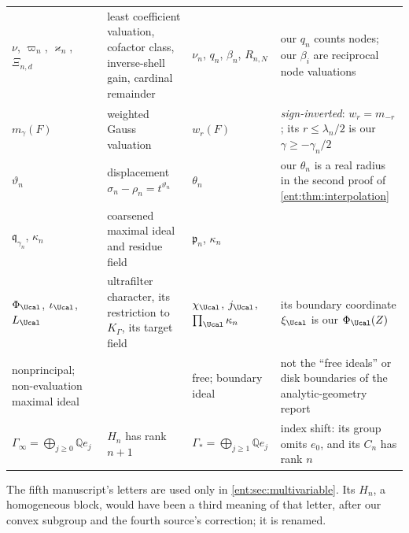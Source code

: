 \documentclass[11pt]{article}
\theoremstyle{plain}
\theoremstyle{plain}
\theoremstyle{plain}
\theoremstyle{definition}
\theoremstyle{definition}
\theoremstyle{definition}
\theoremstyle{definition}
\theoremstyle{remark}
\newcommand{\Q}{\mathbb Q}\newcommand{\Z}{\mathbb Z}\newcommand{\N}{\mathbb N}
\newcommand{\K}{K_\Gamma}\newcommand{\KD}{K_\Delta}
\begin{document}
\begin{center}
\begin{tabularx}{\textwidth}{@{}P{0.2\textwidth}P{0.3\textwidth}P{0.17\textwidth}Y@{}}
$\nu$, $\varpi_n$, $\varkappa_n$, $\Xi_{n,d}$ & least coefficient valuation,
cofactor class, inverse-shell gain, cardinal remainder & $\nu_n$, $q_n$,
$\beta_n$, $R_{n,N}$ & our $q_n$ counts nodes; our $\beta_i$ are reciprocal
node valuations\\[0.3em]
$m_\gamma(F)$ & weighted Gauss valuation & $w_r(F)$ & \emph{sign-inverted}:
$w_r=m_{-r}$; its $r\le\lambda_n/2$ is our $\gamma\ge-\gamma_n/2$\\[0.3em]
$\vartheta_n$ & displacement $\sigma_n-\rho_n=t^{\vartheta_n}$ & $\theta_n$
& our $\theta_n$ is a real radius in the second proof of
\cref{ent:thm:interpolation}\\[0.3em]
$\mathfrak q_{\gamma_n}$, $\kappa_n$ & coarsened maximal ideal and residue
field & $\mathfrak p_n$, $\kappa_n$ & \\[0.3em]
$\Phi_\Ucal$, $\iota_\Ucal$, $L_\Ucal$ & ultrafilter character, its
restriction to $\K$, its target field & $\chi_\Ucal$, $j_\Ucal$,
$\prod_\Ucal\kappa_n$ & its boundary coordinate $\xi_\Ucal$ is our
$\Phi_\Ucal(Z)$\\[0.3em]
nonprincipal; non-evaluation maximal ideal & & free; boundary ideal & not
the ``free ideals'' or disk boundaries of the analytic-geometry
report\\[0.3em]
$\Gamma_\infty=\bigoplus_{j\ge0}\Q e_j$ & $H_n$ has rank $n+1$ &
$\Gamma_*=\bigoplus_{j\ge1}\Q e_j$ & index shift: its group omits $e_0$, and
its $C_n$ has rank $n$\\
\bottomrule
\end{tabularx}
\end{center}

The fifth manuscript's letters are used only in \cref{ent:sec:multivariable}.
Its $H_n$, a homogeneous block, would have been a third meaning of that
letter, after our convex subgroup and the fourth source's correction; it is
renamed.
\end{document}
